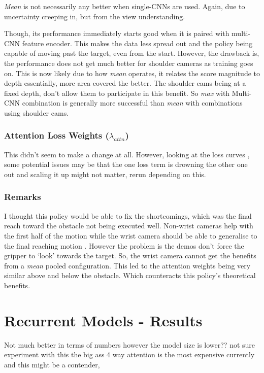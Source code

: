\emph{Mean} is not necessarily any better when single-CNNs are used. Again, due to uncertainty creeping in, but from the view understanding.

Though, its performance immediately starts good when it is paired with multi-CNN feature encoder. This makes the data less spread out  and the policy being capable of moving past the target, even from the start. However, the drawback is, the performance does not get much better for shoulder cameras as training goes on. This is now likely due to how \emph{mean} operates, it relates the score magnitude to depth essentially, more area covered the better. The shoulder cams being at a fixed depth, don't allow them to participate in this benefit. So \emph{max} with Multi-CNN combination is generally more successful than \emph{mean} with combinations using shoulder cams.

\subsubsection{Attention Loss Weights ($\lambda_{attn}$)}
This didn't seem to make a change at all. However, looking at the loss curves , some potential issues may be that the one loss term is drowning the other one out and scaling it up might not matter, rerun depending on this.


\subsubsection{Remarks}
I thought this policy would be able to fix the shortcomings, which was the final reach toward the obstacle not being executed well. Non-wrist cameras help with the first half of the motion while the wrist camera should be able to generalise to the final reaching motion . However the problem is the demos don't force the gripper to `look' towards the target. So, the wrist camera cannot get the benefits from a \emph{mean} pooled configuration. This led to the attention weights being very similar above and below the obstacle. Which counteracts this policy's theoretical benefits.


\section{Recurrent Models - Results}
Not much better in terms of numbers however the model size is lower?? not sure experiment with this the big ass 4 way attention is the most expensive currently and this might be a contender,

